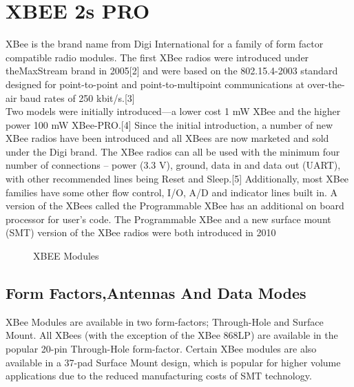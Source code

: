\documentclass[a4paper, 12pt, notitlepage]{report}
\begin{document}
\section{XBEE 2s PRO}

XBee is the brand name from Digi International for a family of form factor compatible radio modules. The first XBee radios were introduced under theMaxStream brand in 2005[2] and were based on the 802.15.4-2003 standard designed for point-to-point and point-to-multipoint communications at over-the-air baud rates of 250 kbit/s.[3]\\

Two models were initially introduced—a lower cost 1 mW XBee and the higher power 100 mW XBee-PRO.[4] Since the initial introduction, a number of new XBee radios have been introduced and all XBees are now marketed and sold under the Digi brand. The XBee radios can all be used with the minimum four number of connections – power (3.3 V), ground, data in and data out (UART), with other recommended lines being Reset and Sleep.[5] Additionally, most XBee families have some other flow control, I/O, A/D and indicator lines built in. A version of the XBees called the Programmable XBee has an additional on board processor for user’s code. The Programmable XBee and a new surface mount (SMT) version of the XBee radios were both introduced in 2010\\

\begin{figure}[h!]
{\par}
\caption{XBEE Modules}
\end{figure}

\subsection{Form Factors,Antennas And Data Modes}

XBee Modules are available in two form-factors; Through-Hole and Surface Mount. All XBees (with the exception of the XBee 868LP) are available in the popular 20-pin Through-Hole form-factor. Certain XBee modules are also available in a 37-pad Surface Mount design, which is popular for higher volume applications due to the reduced manufacturing costs of SMT technology.\\
\end{document}
